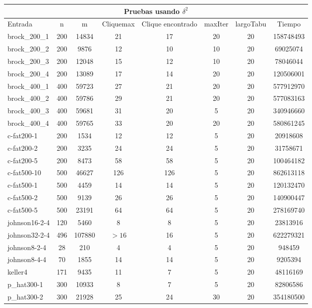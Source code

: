 \begin{tabular}{|l|c|c|c|c|c|c|c|} 
\hline \multicolumn{8}{|c|}{Pruebas usando $\delta^{2}$} \\
\hline
Entrada & n & m & Cliquemax & Clique encontrado & maxIter & largoTabu & Tiempo\\ 
\hline
brock\_200\_1 & 200 & 14834 & 21 & 17 & 20 & 20 & 158748493\\ 
\hline
brock\_200\_2 & 200 & 9876 & 12 & 10 & 10 & 20 & 69025074\\ 
\hline
brock\_200\_3 & 200 & 12048 & 15 & 12 & 10 & 20 & 78046044\\ 
\hline
brock\_200\_4 & 200 & 13089 & 17 & 14 & 20 & 20 & 120506001\\ 
\hline
brock\_400\_1 & 400 & 59723 & 27 & 21 & 20 & 20 & 577912970\\ 
\hline
brock\_400\_2 & 400 & 59786 & 29 & 21 & 20 & 20 & 577083163\\ 
\hline
brock\_400\_3 & 400 & 59681 & 31 & 20 & 5 & 20 & 340946660\\ 
\hline
brock\_400\_4 & 400 & 59765 & 33 & 20 & 20 & 20 & 580861245\\  
\hline
c-fat200-1 & 200 & 1534 & 12 & 12 & 5 & 20 & 20918608\\ 
\hline
c-fat200-2 & 200 & 3235 & 24 & 24 & 5 & 20 & 31758671\\ 
\hline
c-fat200-5 & 200 & 8473 & 58  & 58 & 5 & 20 & 100464182\\ 
\hline
c-fat500-10 & 500 & 46627 & 126 & 126 & 5 & 20 & 862613118\\ 
\hline
c-fat500-1 & 500 & 4459 & 14 & 14 & 5 & 20 & 120132470\\ 
\hline
c-fat500-2 & 500 & 9139 & 26  & 26 & 5 & 20 & 140900447\\
\hline
c-fat500-5 & 500 & 23191 & 64 & 64 & 5 & 20 & 278169740\\ 
\hline
johnson16-2-4 & 120 & 5460 & 8 & 8 & 5 & 20 & 23813916\\ 
\hline
johnson32-2-4 & 496 & 107880 & $>16$  & 16 & 5 & 20 & 622279321\\ 
\hline
johnson8-2-4 & 28 & 210 & 4 & 4 & 5 & 20 & 948459\\ 
\hline
johnson8-4-4 & 70 & 1855 & 14 & 14 & 5 & 20 & 9205394\\ 
\hline
keller4 & 171 & 9435 & 11 & 7 & 5 & 20 & 48116169\\
\hline
p\_hat300-1 & 300 & 10933 & 8  & 7 & 5 & 20 & 82806586\\ 
\hline
p\_hat300-2 & 300 & 21928 & 25 & 24 & 30 & 20 & 354180500\\

\end{tabular}
